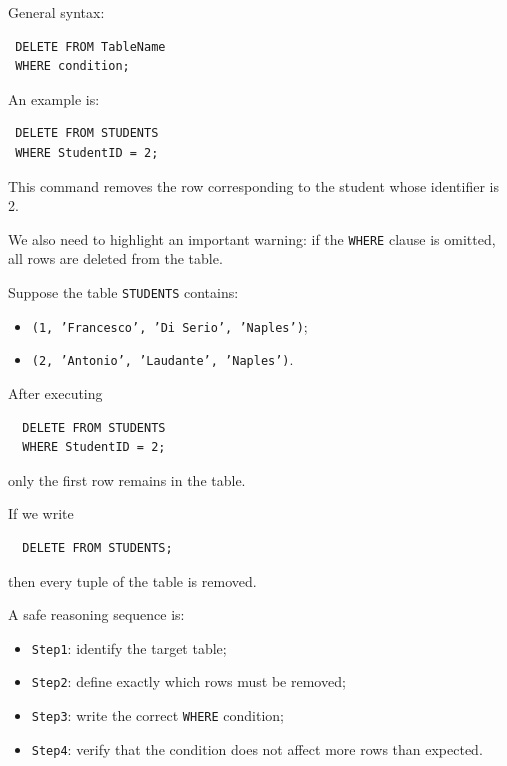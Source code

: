  General syntax:

 \begin{verbatim}
 DELETE FROM TableName
 WHERE condition;
 \end{verbatim}
 \vspace{-0.4cm}

An example is:

 \begin{verbatim}
 DELETE FROM STUDENTS
 WHERE StudentID = 2;
 \end{verbatim}
 \vspace{-0.4cm}

 This command removes the row corresponding to the student whose identifier is 2.

We also need to  highlight an important warning: if the \texttt{WHERE} clause is omitted, all rows are deleted from the table.

\vs
 \begin{example}
  Suppose the table \texttt{STUDENTS} contains:
  \begin{itemize}
   \item \texttt{(1, 'Francesco', 'Di Serio', 'Naples')};
   \vspace{0.2cm}
   \item \texttt{(2, 'Antonio', 'Laudante', 'Naples')}.
  \end{itemize}

  After executing
  \begin{verbatim}
  DELETE FROM STUDENTS
  WHERE StudentID = 2;
  \end{verbatim}
  \vspace{-0.4cm}

  only the first row remains in the table.
 


  If we write
  \begin{verbatim}
  DELETE FROM STUDENTS;
  \end{verbatim}
  \vspace{-0.4cm}

  then every tuple of the table is removed.

  A safe reasoning sequence is:
  \begin{itemize}
   \item \texttt{Step1}: identify the target table;
   \item \texttt{Step2}: define exactly which rows must be removed;
   \item \texttt{Step3}: write the correct \texttt{WHERE} condition;
   \item \texttt{Step4}: verify that the condition does not affect more rows than expected.
  \end{itemize}
 \end{example}

